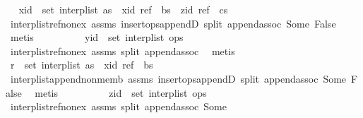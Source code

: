 \begin{isabellebody}
\ \isamarkupfalse%
\ {\isachardoublequoteopen}xid\ {\isasymnotin}\ set\ {\isacharparenleft}interp{\isacharunderscore}list\ {\isacharparenleft}as\ {\isacharat}\ {\isacharbrackleft}{\isacharparenleft}xid{\isacharcomma}\ ref{\isacharparenright}{\isacharbrackright}\ {\isacharat}\ bs\ {\isacharat}\ {\isacharbrackleft}{\isacharparenleft}zid{\isacharcomma}\ ref{\isacharparenright}{\isacharbrackright}\ {\isacharat}\ cs{\isacharparenright}{\isacharparenright}{\isachardoublequoteclose}\isanewline
\ \ \ \ \ \ \ \ \ \ \isamarkupfalse%
\ interp{\isacharunderscore}list{\isacharunderscore}ref{\isacharunderscore}nonex\ assms{\isacharparenleft}{}{\isacharparenright}\ insert{\isacharunderscore}ops{\isacharunderscore}appendD\ split\ append{\isachardot}assoc\ Some\ False\ \isamarkupfalse%
\ metis\isanewline
\ \ \ \ \ \ \ \ \isamarkupfalse%
\ {\isachardoublequoteopen}yid\ {\isasymnotin}\ set\ {\isacharparenleft}interp{\isacharunderscore}list\ ops{\isacharparenright}{\isachardoublequoteclose}\isanewline
\ \ \ \ \ \ \ \ \ \ \isamarkupfalse%
\ interp{\isacharunderscore}list{\isacharunderscore}ref{\isacharunderscore}nonex\ assms{\isacharparenleft}{}{\isacharparenright}\ split\ append{\isachardot}assoc\ \isamarkupfalse%
\ metis\isanewline
\ \ \ \ \ \ \ \ \isamarkupfalse%
\ \isamarkupfalse%
\ {\isachardoublequoteopen}r\ {\isasymnotin}\ set\ {\isacharparenleft}interp{\isacharunderscore}list\ {\isacharparenleft}as\ {\isacharat}\ {\isacharbrackleft}{\isacharparenleft}xid{\isacharcomma}\ ref{\isacharparenright}{\isacharbrackright}\ {\isacharat}\ bs{\isacharparenright}{\isacharparenright}{\isachardoublequoteclose}\isanewline
\ \ \ \ \ \ \ \ \ \ \isamarkupfalse%
\ interp{\isacharunderscore}list{\isacharunderscore}append{\isacharunderscore}non{\isacharunderscore}memb\ assms{\isacharparenleft}{}{\isacharparenright}\ insert{\isacharunderscore}ops{\isacharunderscore}appendD\ split\ append{\isachardot}assoc\ Some\ False\ \isamarkupfalse%
\ metis\isanewline
\ \ \ \ \ \ \ \ \isamarkupfalse%
\ {\isachardoublequoteopen}zid\ {\isasymnotin}\ set\ {\isacharparenleft}interp{\isacharunderscore}list\ ops{\isacharparenright}{\isachardoublequoteclose}\isanewline
\ \ \ \ \ \ \ \ \ \ \isamarkupfalse%
\ interp{\isacharunderscore}list{\isacharunderscore}ref{\isacharunderscore}nonex\ assms{\isacharparenleft}{}{\isacharparenright}\ split\ append{\isachardot}assoc\ Some\ \isamarkupfalse%

\end{isabellebody}
